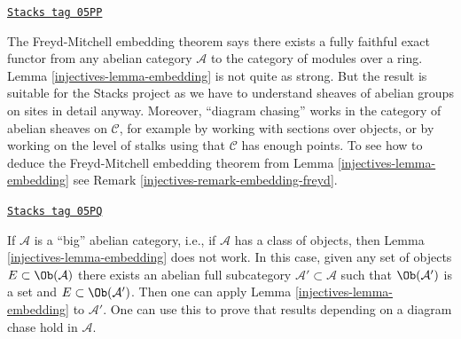 \begin{remark}[Embedding]
\label{injectives-remark-embedding}
\href{https://stacks.math.columbia.edu/tag/05PP}{\texttt{Stacks tag 05PP}}

The Freyd-Mitchell embedding theorem says there exists a fully faithful
exact functor from any abelian category $\mathcal{A}$
to the category of modules over a ring.
Lemma \ref{injectives-lemma-embedding}
is not quite as strong. But the result is suitable for the
Stacks project as we have to understand sheaves of abelian groups on
sites in detail anyway. Moreover, ``diagram chasing'' works in the category
of abelian sheaves on $\mathcal{C}$, for example by working with sections over
objects, or by working on the level of stalks using that $\mathcal{C}$ has
enough points. To see how to deduce the Freyd-Mitchell embedding theorem from
Lemma \ref{injectives-lemma-embedding}
see
Remark \ref{injectives-remark-embedding-freyd}.
\end{remark}

\begin{remark}
\label{injectives-remark-embedding-big}
\href{https://stacks.math.columbia.edu/tag/05PQ}{\texttt{Stacks tag 05PQ}}

If $\mathcal{A}$ is a ``big'' abelian category, i.e., if $\mathcal{A}$
has a class of objects, then
Lemma \ref{injectives-lemma-embedding}
does not work. In this case, given any set of objects
$E \subset \Ob(\mathcal{A})$ there exists an abelian full subcategory
$\mathcal{A}' \subset \mathcal{A}$ such that
$\Ob(\mathcal{A}')$ is a set and $E \subset \Ob(\mathcal{A}')$.
Then one can apply
Lemma \ref{injectives-lemma-embedding}
to $\mathcal{A}'$. One can use this to prove that results depending on
a diagram chase hold in $\mathcal{A}$.
\end{remark}


